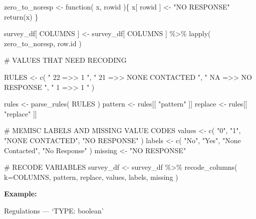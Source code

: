 \documentclass[
  letterpaper,
]{scrbook}
\newenvironment{Shaded}{\begin{snugshade}}{\end{snugshade}}
\newcommand{\AttributeTok}[1]{\textcolor[rgb]{0.40,0.45,0.13}{#1}}
\newcommand{\CommentTok}[1]{\textcolor[rgb]{0.37,0.37,0.37}{#1}}
\newcommand{\ControlFlowTok}[1]{\textcolor[rgb]{0.00,0.23,0.31}{#1}}
\newcommand{\FunctionTok}[1]{\textcolor[rgb]{0.28,0.35,0.67}{#1}}
\newcommand{\NormalTok}[1]{\textcolor[rgb]{0.00,0.23,0.31}{#1}}
\newcommand{\OtherTok}[1]{\textcolor[rgb]{0.00,0.23,0.31}{#1}}
\newcommand{\SpecialCharTok}[1]{\textcolor[rgb]{0.37,0.37,0.37}{#1}}
\newcommand{\StringTok}[1]{\textcolor[rgb]{0.13,0.47,0.30}{#1}}
\begin{document}
\begin{Shaded}
\begin{Highlighting}[]
\NormalTok{zero\_to\_noresp }\OtherTok{\textless{}{-}} \ControlFlowTok{function}\NormalTok{( x, rowid )\{}
\NormalTok{  x[ rowid ] }\OtherTok{\textless{}{-}} \StringTok{"NO RESPONSE"}
  \FunctionTok{return}\NormalTok{(x)}
\NormalTok{\}}

\NormalTok{survey\_df[ COLUMNS ] }\OtherTok{\textless{}{-}} 
\NormalTok{  survey\_df[ COLUMNS ] }\SpecialCharTok{\%\textgreater{}\%} 
  \FunctionTok{lapply}\NormalTok{( zero\_to\_noresp, row.id )}


\CommentTok{\# VALUES THAT NEED RECODING}

\NormalTok{RULES }\OtherTok{\textless{}{-}} \FunctionTok{c}\NormalTok{(    }\StringTok{"   22    =\textgreater{}\textgreater{}     1                "}\NormalTok{,}
               \StringTok{"   21    =\textgreater{}\textgreater{}     NONE CONTACTED   "}\NormalTok{,}
               \StringTok{"   NA    =\textgreater{}\textgreater{}     NO RESPONSE      "}\NormalTok{, }
               \StringTok{"    1    =\textgreater{}\textgreater{}     1                "}\NormalTok{    )}


\NormalTok{rules }\OtherTok{\textless{}{-}} \FunctionTok{parse\_rules}\NormalTok{( RULES )          }
\NormalTok{pattern }\OtherTok{\textless{}{-}}\NormalTok{ rules[[ }\StringTok{"pattern"}\NormalTok{ ]]}
\NormalTok{replace }\OtherTok{\textless{}{-}}\NormalTok{ rules[[ }\StringTok{"replace"}\NormalTok{ ]]}


\CommentTok{\# MEMISC LABELS AND MISSING VALUE CODES }
\NormalTok{values  }\OtherTok{\textless{}{-}} \FunctionTok{c}\NormalTok{( }\StringTok{"0"}\NormalTok{, }\StringTok{"1"}\NormalTok{, }\StringTok{"NONE CONTACTED"}\NormalTok{, }\StringTok{"NO RESPONSE"}\NormalTok{ )}
\NormalTok{labels  }\OtherTok{\textless{}{-}} \FunctionTok{c}\NormalTok{( }\StringTok{"No"}\NormalTok{, }\StringTok{"Yes"}\NormalTok{, }\StringTok{"None Contacted"}\NormalTok{, }\StringTok{"No Response"}\NormalTok{ )}
\NormalTok{missing }\OtherTok{\textless{}{-}} \StringTok{"NO RESPONSE"}

\CommentTok{\# RECODE VARIABLES }
\NormalTok{survey\_df }\OtherTok{\textless{}{-}} 
\NormalTok{  survey\_df }\SpecialCharTok{\%\textgreater{}\%} 
  \FunctionTok{recode\_columns}\NormalTok{( }\AttributeTok{k=}\NormalTok{COLUMNS, pattern, replace, values, labels, missing )}
\end{Highlighting}
\end{Shaded}

\textbf{Example:}

Regulations --- {`TYPE: boolean'}
\end{document}
